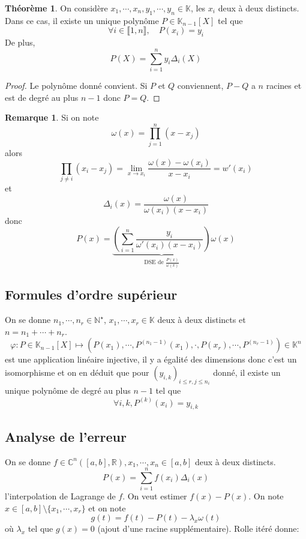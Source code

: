 \documentclass{article}
\theoremstyle{definition}
\newtheorem*{thm}{Théorème}
\newtheorem*{rem}{Remarque}
\begin{document}
\begin{thm}
    On considère $x_1, \cdots, x_n, y_1, \cdots, y_n\in\mathbb K$, les $x_i$ deux à deux distincts. Dans ce cas, il existe un unique polynôme $P\in\mathbb K_{n-1}[X]$ tel que \[\forall i\in\llbracket 1, n\rrbracket, \quad P(x_i)=y_i\]
    De plus, \[
        P(X)=\sum_{i=1}^ny_i\Delta_i(X)
    \]
\end{thm}

\begin{proof}
Le polynôme donné convient. Si $P$ et $Q$ conviennent, $P-Q$ a $n$ racines et est de degré au plus $n-1$ donc $P=Q$.
\end{proof}

\begin{rem}
Si on note \[
    \omega (x)=\prod_{j=1}^n(x-x_j)
\]
alors \[
    \prod_{j\neq i}(x_i-x_j)=\lim_{x\to x_i}\frac{\omega(x)-\omega(x_i)}{x-x_i}=w'(x_i)
\]
et \[
    \Delta_i(x)=\frac{\omega (x)}{\omega(x_i)(x-x_i)}
\]
donc \[
    P(x)=\underbrace{\left(\sum_{i=1}^n\frac{y_i}{\omega'(x_i)(x-x_i)}\right)}_{\text{DSE de }\frac{P(x)}{\omega(x)}}\omega(x)
\]
\end{rem}

\subsection{Formules d'ordre supérieur}

On se donne $n_1, \cdots, n_r\in\mathbb N^\star$, $x_1, \cdots, x_r\in\mathbb K$ deux à deux distincts et $n=n_1+\cdots+n_r$. \[
    \varphi: P\in\mathbb K_{n-1}[X]\longmapsto(P(x_1), \cdots, P^{(n_1-1)}(x_1), \cdot, P(x_r), \cdots, P^{(n_r-1)})\in\mathbb K^n
\]
est une application linéaire injective, il y a égalité des dimensions donc c'est un isomorphisme et on en déduit que pour $(y_{i, k})_{i\leq r, j\leq n_i}$ donné, il existe un unique polynôme de degré au plus $n-1$ tel que \[
    \forall i, k, P^{(k)}(x_i)=y_{i, k}
\]

\subsection{Analyse de l'erreur}

On se donne $f\in\mathbb C^n([a, b], \mathbb R) ,x_1, \cdots, x_n\in [a, b]$ deux à deux distincts. \[
    P(x)=\sum_{i=1}^nf (x_i)\Delta_i(x)
\]
l'interpolation de Lagrange de $f$. On veut estimer $f(x)-P(x)$. On note $x\in [a, b]\setminus\{x_1, \cdots, x_r\}$ et on note \[
    g(t)=f(t)-P(t)-\lambda_x\omega(t)
\]
où $\lambda_x$ tel que $g(x)=0$ (ajout d'une racine supplémentaire). Rolle itéré donne:
\end{document}
